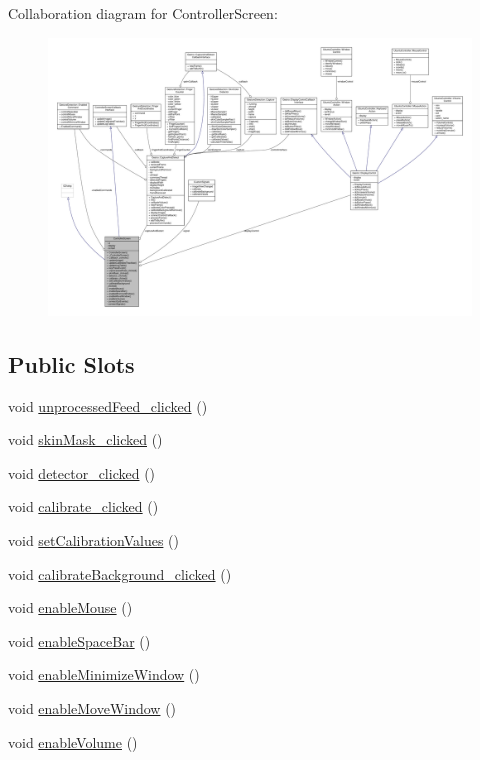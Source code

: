 Collaboration diagram for Controller\+Screen\+:
\nopagebreak
\begin{figure}[H]
\begin{center}
\leavevmode
\includegraphics[width=350pt]{class_controller_screen__coll__graph}
\end{center}
\end{figure}
\subsection*{Public Slots}
\begin{DoxyCompactItemize}
\item 
void \hyperlink{class_controller_screen_aac8b2856372fa02c4f793cf9183dffed}{unprocessed\+Feed\+\_\+clicked} ()
\item 
void \hyperlink{class_controller_screen_a4d9db4a832f667aacb7d7532f752fd1b}{skin\+Mask\+\_\+clicked} ()
\item 
void \hyperlink{class_controller_screen_ac4f535408ffdfa10cbfa1a89d833f592}{detector\+\_\+clicked} ()
\item 
void \hyperlink{class_controller_screen_af7f51cf63bb9d2526b0025f35f1e7731}{calibrate\+\_\+clicked} ()
\item 
void \hyperlink{class_controller_screen_ae4d6a51231fb1f6f8809ce3d036592bd}{set\+Calibration\+Values} ()
\item 
void \hyperlink{class_controller_screen_a7a71b9bc26a3de704f8613f3f2a08fb7}{calibrate\+Background\+\_\+clicked} ()
\item 
void \hyperlink{class_controller_screen_a27681be09b97984576a895ad21343b65}{enable\+Mouse} ()
\item 
void \hyperlink{class_controller_screen_aa75c31cfb62427bba649b30e58130bfc}{enable\+Space\+Bar} ()
\item 
void \hyperlink{class_controller_screen_ad27b95368191153fa12d05091728b022}{enable\+Minimize\+Window} ()
\item 
void \hyperlink{class_controller_screen_a90e6dcfb4a0dfb2e845890bba3f208f5}{enable\+Move\+Window} ()
\item 
void \hyperlink{class_controller_screen_ae08e0ea89830d8018ff9086e4c4362a5}{enable\+Volume} ()
\end{DoxyCompactItemize}
